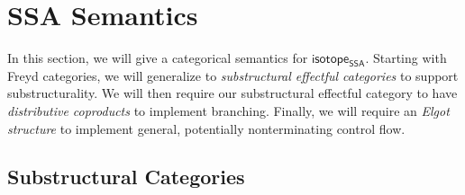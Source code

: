 \documentclass[acmsmall,screen,review]{acmart}
\newcommand{\ms}[1]{\ensuremath{\mathsf{#1}}}
\newcommand{\isotopessa}{\ms{isotope_{SSA}}}
\begin{document}
\section{SSA Semantics}

\label{sec:semantics}

In this section, we will give a categorical semantics for \isotopessa. Starting
with Freyd categories, we will generalize to \textit{substructural effectful
categories} to support substructurality. We will then require our substructural
effectful category to have \textit{distributive coproducts} to implement
branching. Finally, we will require an \textit{Elgot structure} to implement
general, potentially nonterminating control flow.

\subsection{Substructural Categories}
\end{document}
